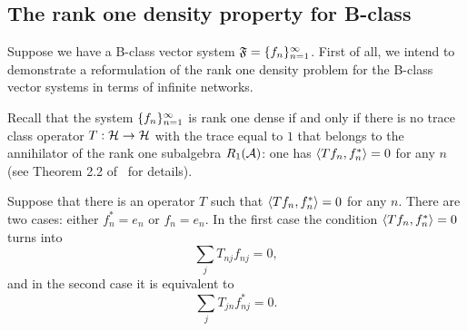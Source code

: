 \documentclass[12pt,oneside,a4paper]{amsart}
\begin{document}
    \subsection{The rank one density property for B-class}
      Suppose we have a B-class vector system $\fsys=\seq{f}$.
      First of all, we intend to demonstrate a reformulation of the rank one density problem for
        the B-class vector systems in terms of infinite networks.

      Recall that the system $\seq{f}$ is rank one dense
        if and only if there is no trace class operator $T: \cal{H} \to \cal{H}$ with the trace equal to $1$
        that belongs to the annihilator of the rank one subalgebra $R_1(\cal{A})$: one has $\inner{Tf_n}{f_n^*} = 0$ for any $n$
        (see Theorem 2.2 of~\cite{katavolos} for details).

      Suppose that there is an operator $T$ such that $\inner{Tf_n}{f_n^*} = 0$ for any $n$.
      There are two cases: either $f^*_n = e_n$ or $f_n = e_n$.
      In the first case the condition $\inner{Tf_n}{f_n^*} = 0$ turns into
      \begin{equation}
          \label{left-eqn}
          \sum_j T_{nj} f_{nj} = 0,
      \end{equation}
      and in the second case it is equivalent to
      \begin{equation}
          \label{right-eqn}
          \sum_j T_{jn} f^*_{nj} = 0.
      \end{equation}
\end{document}
